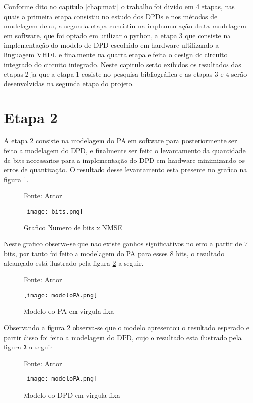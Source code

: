Conforme dito no capitulo \ref{chap:mati} o trabalho foi divido em 4 etapas, nas quais a primeira etapa consistiu no estudo dos DPDs e nos métodos de modelagem deles, a segunda etapa consistiu na implementação desta modelagem em software, que foi optado em utilizar o python, a etapa 3 que consiste na implementação do modelo de DPD escolhido em hardware ultilizando a linguagem VHDL e finalmente na quarta etapa e feita o design do circuito integrado do circuito integrado.
Neste capitulo serão exibidos os resultados das etapas 2 ja que a etapa 1 cosiste no pesquisa bibliográfica e as etapas 3 e 4 serão desenvolvidas na segunda etapa do projeto.

\section{Etapa 2}
A etapa 2 consiste na modelagem do PA em software para posteriormente ser feito a modelagem do DPD, e finalmente ser feito o levantamento da quantidade de bits necessarios para a implementação do DPD em hardware minimizando os erros de quantização. 
O resultado desse levantamento esta presente no grafico na figura \ref{fig:bits}.
\begin{figure}[ht!]
    \centering
    \captionsetup{justification=centering}
    \caption*{Fonte: Autor}
    \texttt{[image: bits.png]}
    \caption{Grafico Numero de bits x NMSE}
    \label{fig:bits}
\end{figure}

Neste grafico observa-se que nao existe ganhos significativos no erro a partir de 7 bits, por tanto foi feito a modelagem do PA para esses 8 bits, o resultado alcançado está ilustrado pela figura \ref{fig:modelopa} a seguir.
\begin{figure}[ht!]
    \centering
    \captionsetup{justification=centering}
    \caption*{Fonte: Autor}
    \texttt{[image: modeloPA.png]}
    \caption{Modelo do PA em virgula fixa}
    \label{fig:modelopa}
\end{figure}

Observando a figura \ref{fig:modelopa} observa-se que o modelo apresentou o resultado esperado e partir disso foi feito a modelagem do DPD, cujo o resultado esta ilustrado pela figura \ref{fig:modelodpd} a seguir

\begin{figure}[ht!]
    \centering
    \captionsetup{justification=centering}
    \caption*{Fonte: Autor}
    \texttt{[image: modeloPA.png]}
    \caption{Modelo do DPD em virgula fixa}
    \label{fig:modelodpd}
\end{figure}